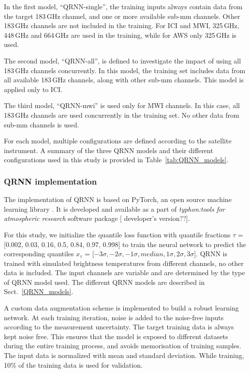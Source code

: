 \documentclass[amt, manuscript]{copernicus}
\newcommand{\todo}[1]{{\color{red} #1}}
\begin{document}
In the first model, ``QRNN-single'', the training inputs always contain data from the target 183\,GHz channel, and one or more available sub-mm channels. Other 183\,GHz channels are not included in the training. For ICI and MWI, 325\,GHz, 448\,GHz and 664\,GHz are used in the training, while for AWS only 325\,GHz is used. 
 
The second model, ``QRNN-all'', is defined to investigate the  impact of using all 183\,GHz channels concurrently. In this model, the training set includes data from all available 183\,GHz channels, along with other sub-mm channels. This model is applied only to ICI.

The third model, ``QRNN-mwi'' is used only for MWI channels. In this case, all 183\,GHz channels are used concurrently in the training set. No other data from sub-mm channels is used.

For each model, multiple configurations are defined according to the satellite instrument. A summary of the three QRNN models and their different configurations used in this study is provided in Table~\ref{tab:QRNN_models}.

\subsubsection{QRNN implementation}
\label{sec:qrnn-implementation}

The implementation of QRNN is based on PyTorch, an open source machine learning library \citep{paszke2017automatic}. It is developed and available as a part of \textit{typhon:tools for atmospheric research} software package [\todo{developer's version??}].

For this study, we initialize the quantile loss function with quantile fractions $\tau$ = [0.002, 0.03, 0.16, 0.5, 0.84, 0.97, 0.998] to train the neural network to predict the corresponding quantiles $x_{\tau}$ = [$-3\sigma, -2\sigma, -1\sigma, median, 1\sigma, 2\sigma, 3\sigma $]. QRNN is trained with simulated brightness temperatures from different channels, no other data is included. The input channels are variable and are determined by the type of QRNN model used. The different QRNN models are described in Sect.~\ref{QRNN_models}. 

A custom data augmentation scheme is implemented to build a robust learning network. At each training iteration, noise is added to the noise-free inputs according to the measurement uncertainty. The target training data is always kept noise free. This ensures that the model is exposed to different datasets during the entire training process, and avoids memorisation of training samples. The input data is normalized with mean and standard deviation. While training, 10\% of the training data is used for validation.
 
\end{document}
